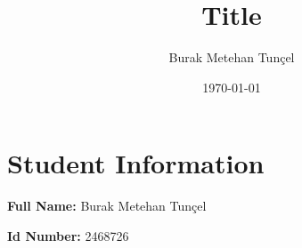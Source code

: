 \documentclass{article}
\title{Title}
\author{Burak Metehan Tunçel}
\date{\today}
\begin{document}
\section*{Student Information}

\noindent \textbf{Full Name:} Burak Metehan Tunçel

\noindent \textbf{Id Number:} 2468726



\newpage


\newpage

\end{document}
